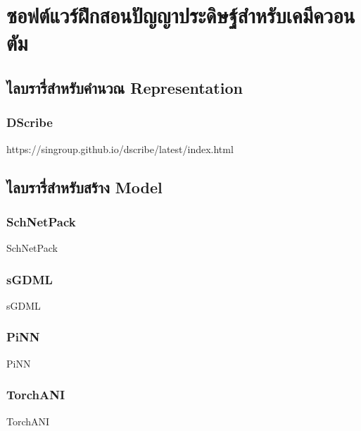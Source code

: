 

\chapter{ซอฟต์แวร์ฝึกสอนปัญญาประดิษฐ์สำหรับเคมีควอนตัม}
\label{ch:ml_lib}

\section{ไลบรารี่สำหรับคำนวณ Representation}

\subsection{DScribe}

https://singroup.github.io/dscribe/latest/index.html

\section{ไลบรารี่สำหรับสร้าง Model}

\subsection{SchNetPack}

SchNetPack\cite{schutt2019}

\subsection{sGDML}

sGDML\cite{chmiela2019}

\subsection{PiNN}

PiNN\cite{shao2020}

\subsection{TorchANI}

TorchANI\cite{gao2020}
